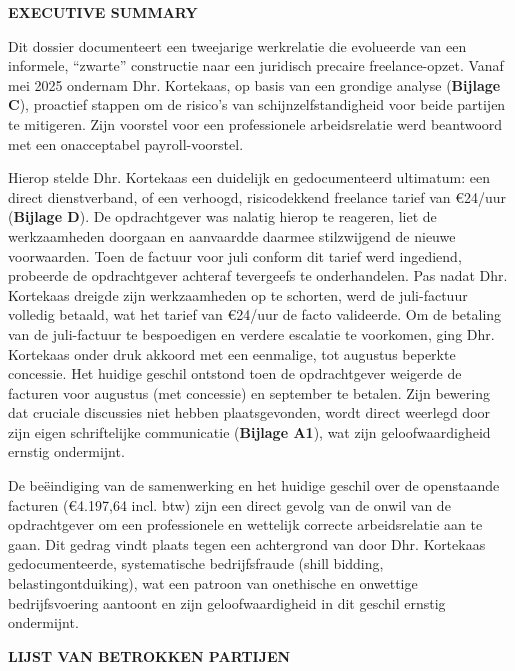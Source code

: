 \documentclass[10pt,a4paper]{article}
\begin{document}
\begin{adjustwidth}{15mm}{15mm}

\vspace{1em}

{\fontsize{11}{16}\selectfont\textbf{EXECUTIVE SUMMARY}}

Dit dossier documenteert een tweejarige werkrelatie die evolueerde van een informele, ``zwarte'' constructie naar een juridisch precaire freelance-opzet. Vanaf mei 2025 ondernam Dhr. Kortekaas, op basis van een grondige analyse (\textbf{Bijlage C}), proactief stappen om de risico's van schijnzelfstandigheid voor beide partijen te mitigeren. Zijn voorstel voor een professionele arbeidsrelatie werd beantwoord met een onacceptabel payroll-voorstel.

Hierop stelde Dhr. Kortekaas een duidelijk en gedocumenteerd ultimatum: een direct dienstverband, of een verhoogd, risicodekkend freelance tarief van €24/uur (\textbf{Bijlage D}). De opdrachtgever was nalatig hierop te reageren, liet de werkzaamheden doorgaan en aanvaardde daarmee stilzwijgend de nieuwe voorwaarden. Toen de factuur voor juli conform dit tarief werd ingediend, probeerde de opdrachtgever achteraf tevergeefs te onderhandelen. Pas nadat Dhr. Kortekaas dreigde zijn werkzaamheden op te schorten, werd de juli-factuur volledig betaald, wat het tarief van €24/uur de facto valideerde. Om de betaling van de juli-factuur te bespoedigen en verdere escalatie te voorkomen, ging Dhr. Kortekaas onder druk akkoord met een eenmalige, tot augustus beperkte concessie. Het huidige geschil ontstond toen de opdrachtgever weigerde de facturen voor augustus (met concessie) en september te betalen. Zijn bewering dat cruciale discussies niet hebben plaatsgevonden, wordt direct weerlegd door zijn eigen schriftelijke communicatie (\textbf{Bijlage A1}), wat zijn geloofwaardigheid ernstig ondermijnt.

De beëindiging van de samenwerking en het huidige geschil over de openstaande facturen (€4.197,64 incl. btw) zijn een direct gevolg van de onwil van de opdrachtgever om een professionele en wettelijk correcte arbeidsrelatie aan te gaan. Dit gedrag vindt plaats tegen een achtergrond van door Dhr. Kortekaas gedocumenteerde, systematische bedrijfsfraude (shill bidding, belastingontduiking), wat een patroon van onethische en onwettige bedrijfsvoering aantoont en zijn geloofwaardigheid in dit geschil ernstig ondermijnt.

\vspace{1em}

{\fontsize{11}{16}\selectfont\textbf{LIJST VAN BETROKKEN PARTIJEN}}


\end{adjustwidth}
\end{document}
